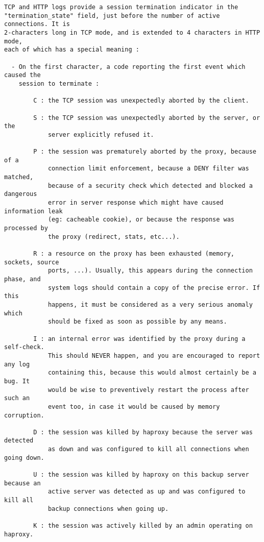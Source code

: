 \begin{verbatim}
TCP and HTTP logs provide a session termination indicator in the
"termination_state" field, just before the number of active connections. It is
2-characters long in TCP mode, and is extended to 4 characters in HTTP mode,
each of which has a special meaning :

  - On the first character, a code reporting the first event which caused the
    session to terminate :

        C : the TCP session was unexpectedly aborted by the client.

        S : the TCP session was unexpectedly aborted by the server, or the
            server explicitly refused it.

        P : the session was prematurely aborted by the proxy, because of a
            connection limit enforcement, because a DENY filter was matched,
            because of a security check which detected and blocked a dangerous
            error in server response which might have caused information leak
            (eg: cacheable cookie), or because the response was processed by
            the proxy (redirect, stats, etc...).

        R : a resource on the proxy has been exhausted (memory, sockets, source
            ports, ...). Usually, this appears during the connection phase, and
            system logs should contain a copy of the precise error. If this
            happens, it must be considered as a very serious anomaly which
            should be fixed as soon as possible by any means.

        I : an internal error was identified by the proxy during a self-check.
            This should NEVER happen, and you are encouraged to report any log
            containing this, because this would almost certainly be a bug. It
            would be wise to preventively restart the process after such an
            event too, in case it would be caused by memory corruption.

        D : the session was killed by haproxy because the server was detected
            as down and was configured to kill all connections when going down.

        U : the session was killed by haproxy on this backup server because an
            active server was detected as up and was configured to kill all
            backup connections when going up.

        K : the session was actively killed by an admin operating on haproxy.


\end{verbatim}
